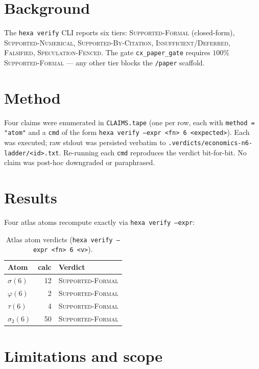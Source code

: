\documentclass[11pt,a4paper]{article}
\begin{document}
\section{Background}
\label{sec:bg}

The \texttt{hexa verify} CLI \cite{hexacodex2026} reports six tiers:
\textsc{Supported-Formal} (closed-form), \textsc{Supported-Numerical},
\textsc{Supported-By-Citation}, \textsc{Insufficient/Deferred},
\textsc{Falsified}, \textsc{Speculation-Fenced}. The gate
\texttt{cx\_paper\_gate} requires $100\%$ \textsc{Supported-Formal} ---
any other tier blocks the \texttt{/paper} scaffold.

\section{Method}
\label{sec:method}

Four claims were enumerated in \texttt{CLAIMS.tape} (one per row, each
with \texttt{method = "atom"} and a \texttt{cmd} of the form
\texttt{hexa verify --expr <fn> 6 <expected>}). Each was executed; raw
stdout was persisted verbatim to
\texttt{.verdicts/economics-n6-ladder/<id>.txt}. Re-running each
\texttt{cmd} reproduces the verdict bit-for-bit. No claim was post-hoc
downgraded or paraphrased.

\section{Results}
\label{sec:results}

Four atlas atoms recompute exactly via \texttt{hexa verify --expr}:

\begin{table}[h]
\centering
\caption{Atlas atom verdicts (\texttt{hexa verify --expr <fn> 6 <v>}).}
\label{tab:atoms}
\begin{tabular}{lrl}
\toprule
\textbf{Atom} & \textbf{calc} & \textbf{Verdict} \\
\midrule
$\sigma(6)$    & 12 & \textsc{Supported-Formal} \\
$\varphi(6)$   &  2 & \textsc{Supported-Formal} \\
$\tau(6)$      &  4 & \textsc{Supported-Formal} \\
$\sigma_2(6)$  & 50 & \textsc{Supported-Formal} \\
\bottomrule
\end{tabular}
\end{table}

\section{Limitations and scope}
\label{sec:limits}
\end{document}
